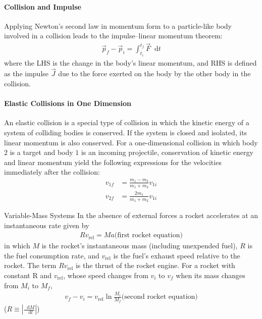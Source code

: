 \documentclass{article}
\newcommand*\diff{\mathop{}\!\mathrm{d}}
\numberwithin{equation}{subsection} %
\theoremstyle{definition}
\begin{document}
\paragraph{Collision and Impulse} Applying Newton’s second law in
momentum form to a particle-like body involved in a collision
leads to the impulse–linear momentum theorem:
\begin{align}
    \vec{p}_f - \vec{p}_i = \int_{t_i}^{t_f} \vec{F} \diff t
\end{align}
where the LHS is the change in the body’s linear
momentum, and RHS is defined as the impulse $\vec{J}$ due to the force
exerted on the body by the other body in the collision.

\paragraph{Elastic Collisions in One Dimension} An elastic collision
is a special type of collision in which the kinetic energy of a system
of colliding bodies is conserved. If the system is closed and
isolated, its linear momentum is also conserved. For a one-dimensional
collision in which body $2$ is a target and body $1$ is an incoming
projectile, conservation of kinetic energy and linear momentum yield
the following expressions for the velocities immediately after the
collision:
\begin{align}
    v_{1f} &= \frac{m_1-m_2}{m_1+m_2} v_{1i} \\
    v_{2f} &= \frac{2m_1}{m_1+m_2} v_{1i}
\end{align}

Variable-Mass Systems In the absence of external forces a rocket
accelerates at an instantaneous rate given by
\begin{align}
    R v_{\text{rel}} = Ma \text{(first rocket equation)}
\end{align}
in which $M$ is the rocket’s instantaneous mass (including
unexpended fuel), $R$ is the fuel consumption rate, and $v_{\text{rel}}$ is the fuel’s
exhaust speed relative to the rocket. The term $R v_{\text{rel}}$ is the thrust of
the rocket engine. For a rocket with constant R and $v_{\text{rel}}$, whose speed
changes from $v_i$ to $v_f$ when its mass changes from $M_i$ to $M_f$,
\begin{align}
    v_f - v_i = v_{\text{rel}} \ln\frac{M_i}{M_f} \text{(second rocket
    equation)}
\end{align}
($R\equiv |\frac{\diff M}{\diff t}|$)
\end{document}
